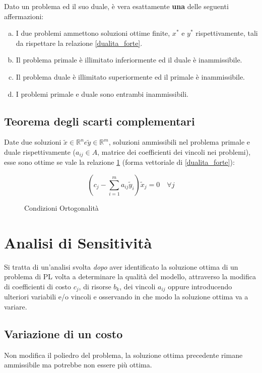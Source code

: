 \documentclass[\main/main.tex]{subfiles}
\begin{document}
\begin{theorem}
  Dato un problema ed il suo duale, è vera esattamente \textbf{una} delle seguenti affermazioni:
  \begin{enumerate}[a)]
    \item I due problemi ammettono soluzioni ottime finite, $x^*$ e $y^*$ rispettivamente, tali da rispettare la relazione \ref{dualita_forte}.
    \item Il problema primale è illimitato inferiormente ed il duale è inammissibile.
    \item Il problema duale è illimitato superiormente ed il primale è inammissibile.
    \item I problemi primale e duale sono entrambi inammissibili.
  \end{enumerate}
\end{theorem}

\subsection{Teorema degli scarti complementari}
\begin{theorem}
  Date due soluzioni $\tilde{x} \in \mathbb{R}^n e \tilde{y} \in \mathbb{R}^m$, soluzioni ammissibili nel problema primale e duale rispettivamente ($a_{ij} \in A$, matrice dei coefficienti dei vincoli nei problemi), esse sono ottime se vale la relazione \ref{dualita_forte_vettoriale} (forma vettoriale di \ref{dualita_forte}):
  \begin{figure}
    \[
      (c_j - \sum_{i=1}^m a_{ij} \tilde{y}_i)\tilde{x}_j = 0 \quad \forall j
    \]
    \caption{Condizioni Ortogonalità}
    \label{dualita_forte_vettoriale}
  \end{figure}
\end{theorem}

\section{Analisi di Sensitività}
Si tratta di un'analisi svolta \textit{dopo} aver identificato la soluzione ottima di un problema di PL volta a determinare la qualità del modello, attraverso la modifica di coefficienti di costo $c_j$, di risorse $b_k$, dei vincoli $a_{ij}$ oppure introducendo ulteriori variabili e/o vincoli e osservando in che modo la soluzione ottima va a variare.

\subsection{Variazione di un costo} \label{cost_variation}
Non modifica il poliedro del problema, la soluzione ottima precedente rimane ammissibile ma potrebbe non essere più ottima.
\end{document}
